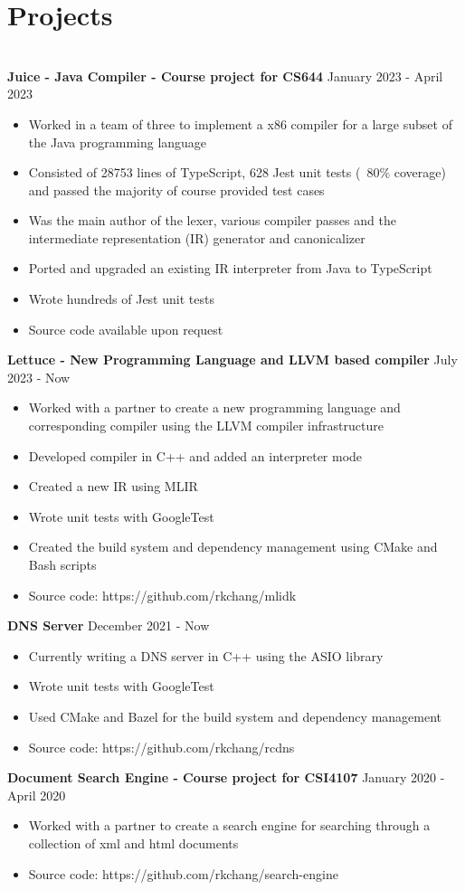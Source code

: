 \documentclass{article}
\begin{document}
\section{Projects}
\hrulefill \\
\textbf{Juice - Java Compiler - Course project for CS644} \hfill January 2023 - April 2023
\begin{itemize}[noitemsep]
    \item Worked in a team of three to implement a x86 compiler for a large subset of the Java programming language
    \item Consisted of 28753 lines of TypeScript, 628 Jest unit tests (~80\% coverage) and passed the majority of course provided test cases
    \item Was the main author of the lexer, various compiler passes and the intermediate representation (IR) generator and canonicalizer
    \item Ported and upgraded an existing IR interpreter from Java to TypeScript
    \item Wrote hundreds of Jest unit tests
    \item Source code available upon request
\end{itemize}

\textbf{Lettuce - New Programming Language and LLVM based compiler} \hfill July 2023 - Now
\begin{itemize}[noitemsep]
    \item Worked with a partner to create a new programming language and corresponding compiler using the LLVM compiler infrastructure
    \item Developed compiler in C++ and added an interpreter mode
    \item Created a new IR using MLIR
    \item Wrote unit tests with GoogleTest
    \item Created the build system and dependency management using CMake and Bash scripts
    \item Source code: https://github.com/rkchang/mlidk
\end{itemize}

\textbf{DNS Server} \hfill December 2021 - Now
\begin{itemize}[noitemsep]
    \item Currently writing a DNS server in C++ using the ASIO library
    \item Wrote unit tests with GoogleTest
    \item Used CMake and Bazel for the build system and dependency management
    \item Source code: https://github.com/rkchang/rcdns
\end{itemize}

\textbf{Document Search Engine - Course project for CSI4107} \hfill January 2020 - April 2020
\begin{itemize}[noitemsep]
    \item Worked with a partner to create a search engine for searching through a collection of xml and html documents
    \item Source code: https://github.com/rkchang/search-engine
\end{itemize}
\end{document}
